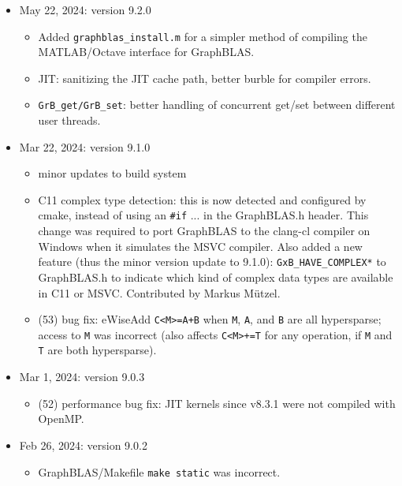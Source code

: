 \documentclass[12pt]{article}
\begin{document}
\begin{itemize}
\item May 22, 2024: version 9.2.0

    \begin{itemize}
    \item Added \verb'graphblas_install.m' for a simpler method of compiling
        the MATLAB/Octave interface for GraphBLAS.
    \item JIT: sanitizing the JIT cache path, better burble for compiler errors.
    \item \verb'GrB_get/GrB_set': better handling of concurrent get/set between
        different user threads.
    \end{itemize}

\item Mar 22, 2024: version 9.1.0

    \begin{itemize}
    \item minor updates to build system
    \item C11 complex type detection:  this is now detected and configured by
        cmake, instead of using an \verb'#if' ... in the GraphBLAS.h header.
        This change was required to port GraphBLAS to the clang-cl compiler
        on Windows when it simulates the MSVC compiler.  Also added a new
        feature (thus the minor version update to 9.1.0):
        \verb'GxB_HAVE_COMPLEX*' to
        GraphBLAS.h to indicate which kind of complex data types are available
        in C11 or MSVC.  Contributed by Markus M\"{u}tzel.
    \item (53) bug fix: eWiseAdd \verb'C<M>=A+B' when \verb'M', \verb'A',
        and \verb'B' are all hypersparse; access to \verb'M' was incorrect
        (also affects \verb'C<M>+=T' for any operation, if \verb'M' and
        \verb'T' are both hypersparse).
    \end{itemize}

\item Mar 1, 2024: version 9.0.3

    \begin{itemize}
    \item (52) performance bug fix: JIT kernels since v8.3.1 were not compiled
    with OpenMP.
    \end{itemize}

\item Feb 26, 2024: version 9.0.2

    \begin{itemize}
    \item GraphBLAS/Makefile \verb"make static" was incorrect.
    \end{itemize}


\end{itemize}
\end{document}
